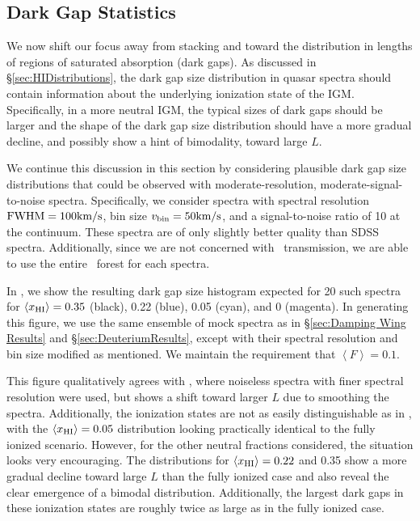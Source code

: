\subsection{Dark Gap Statistics} \label{sec:DarkGaps}


We now shift our focus away from stacking and toward the distribution in lengths of regions of saturated absorption (dark gaps). As discussed in \S\ref{sec:HIDistributions}, the dark gap size distribution in quasar spectra should contain information about the underlying ionization state of the IGM. Specifically, in a more neutral IGM, the typical sizes of dark gaps should be larger and the shape of the dark gap size distribution should have a more gradual decline, and possibly show a hint of bimodality, toward large $L$. 


We continue this discussion in this section by considering plausible dark gap size distributions that could be observed with moderate-resolution, moderate-signal-to-noise spectra. Specifically, we consider spectra with spectral resolution $\text{FWHM} = 100\text{km}/\text{s}$, bin size $v_{\text{bin}} = 50\text{km}/\text{s}$, and a signal-to-noise ratio of 10 at the continuum. These spectra are of only slightly better quality than SDSS spectra. Additionally, since we are not concerned with \lyb\ transmission, we are able to use the entire \lya\ forest for each spectra.



In , we show the resulting dark gap size histogram expected for 20 such spectra for $\langle x_{\text{HI}}\rangle = 0.35$ (black), 0.22 (blue), 0.05 (cyan), and 0 (magenta). In generating this figure, we use the same ensemble of mock spectra as in \S\ref{sec:Damping Wing Results} and \S\ref{sec:DeuteriumResults}, except with their spectral resolution and bin size modified as mentioned. We maintain the requirement that $\left\langle F \right\rangle = 0.1$. 


This figure qualitatively agrees with , where noiseless spectra with finer spectral resolution were used, but shows a shift toward larger $L$ due to smoothing the spectra. Additionally, the ionization states are not as easily distinguishable as in , with the $\langle x_{\text{HI}}\rangle = 0.05$ distribution looking practically identical to the fully ionized scenario. However, for the other neutral fractions considered, the situation looks very encouraging. The distributions for $\langle x_{\text{HI}}\rangle = 0.22$ and 0.35 show a more gradual decline toward large $L$ than the fully ionized case and also reveal the clear emergence of a bimodal distribution. Additionally, the largest dark gaps in these ionization states are roughly twice as large as in the fully ionized case. 


